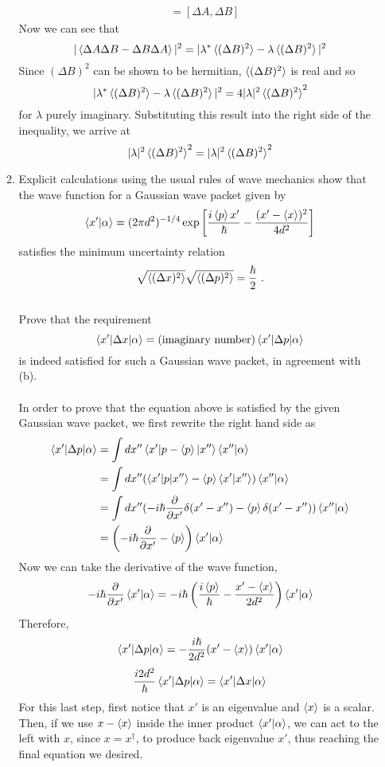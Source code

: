 \documentclass[11pt,letterpaper]{article}
\begin{document}
\begin{enumerate}
\begin{enumerate}
\begin{align*}[A,B]
\\&=[\Delta A,\Delta B]
\end{align*}
Now we can see that
$$|\braket{\Delta A \Delta B-\Delta B\Delta A}|^2 = |\lambda^*\braket{(\Delta B)^2}-\lambda\braket{(\Delta B)^2}|^2$$
Since $(\Delta B)^2$ can be shown to be hermitian, $\braket{(\Delta B)^2}$ is real and so
$$|\lambda^*\braket{(\Delta B)^2}-\lambda\braket{(\Delta B)^2}|^2= 4|\lambda|^2\braket{(\Delta B)^2}^2$$
for $\lambda$ purely imaginary. Substituting this result into the right side of the inequality, we arrive at 
$$|\lambda|^2\braket{(\Delta B)^2}^2 = |\lambda|^2\braket{(\Delta B)^2}^2$$

\item Explicit calculations using the usual rules of wave mechanics show that the wave function for a Gaussian wave packet given by 
$$\braket{x^\prime|\alpha} = (2\pi d^2)^{-1/4}\exp{\left[\frac{i\braket{p}x^\prime}{\hbar}-\frac{(x^\prime-\braket{x})^2}{4d^2}\right]}$$
satisfies the minimum uncertainty relation
$$\sqrt{\braket{(\Delta x)^2}}\sqrt{\braket{(\Delta p)^2}} = \frac{\hbar}{2}~.$$
\\Prove that the requirement
$$\braket{x^\prime|\Delta x|\alpha} = (\text{imaginary number})\braket{x^\prime|\Delta p|\alpha}$$
is indeed satisfied for such a Gaussian wave packet, in agreement with (b).
\\ \\In order to prove that the equation above is satisfied by the given Gaussian wave packet, we first rewrite the right hand side as
\begin{align*}\braket{x^\prime|\Delta p|\alpha} &= \int{dx''\braket{x'|p-\braket{p}|x''}\braket{x''|\alpha}}\\
&=\int{dx''(\braket{x'|p|x''}-\braket{p}\braket{x'|x''})\braket{x''|\alpha}}\\
&=\int{dx''(-i\hbar\frac{\partial}{\partial x'}\delta(x'-x'') -\braket p\delta(x'-x''))\braket{x''|\alpha}}\\
&=\left(-i\hbar\frac{\partial}{\partial x'}-\braket p\right)\braket{x'|\alpha}
\end{align*}
Now we can take the derivative of the wave function,
$$-i\hbar\frac{\partial}{\partial x'}\braket{x'|\alpha} =-i\hbar \left(\frac{i\braket p}{\hbar}-\frac{x'-\braket x}{2d^2}\right)\braket{x'|\alpha}$$
Therefore,
$$\braket{x'|\Delta p|\alpha} = -\frac{i\hbar}{2d^2}(x'-\braket{x})\braket{x'|\alpha}$$
$$\frac{i2d^2}{\hbar}\braket{x'|\Delta p|\alpha} = \braket{x'|\Delta x|\alpha}$$
For this last step, first notice that $x'$ is an eigenvalue and $\braket x$ is a scalar. Then, if we use $x-\braket x$ inside the inner product $\braket{x'|\alpha}$, we can act to the left with $x$, since $x=x^\dag$,  to produce back eigenvalue $x'$, thus reaching the final equation we desired.
\end{enumerate}


\end{enumerate}
\end{document}
